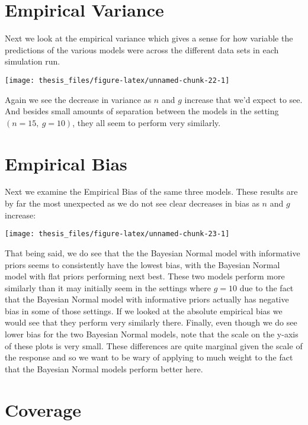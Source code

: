 \documentclass[12pt,twoside]{reedthesis}
\begin{document}
\hypertarget{empirical-variance}{%
\section{Empirical Variance}\label{empirical-variance}}

Next we look at the empirical variance which gives a sense for how variable the predictions of the various models were across the different data sets in each simulation run.
\begin{center}\texttt{[image: thesis\_files/figure-latex/unnamed-chunk-22-1]} \end{center}

Again we see the decrease in variance as \(n\) and \(g\) increase that we'd expect to see. And besides small amounts of separation between the models in the setting \((n = 15, \ g = 10)\), they all seem to perform very similarly.

\hypertarget{empirical-bias}{%
\section{Empirical Bias}\label{empirical-bias}}

Next we examine the Empirical Bias of the same three models. These results are by far the most unexpected as we do not see clear decreases in bias as \(n\) and \(g\) increase:
\begin{center}\texttt{[image: thesis\_files/figure-latex/unnamed-chunk-23-1]} \end{center}

That being said, we do see that the the Bayesian Normal model with informative priors seems to consistently have the lowest bias, with the Bayesian Normal model with flat priors performing next best. These two models perform more similarly than it may initially seem in the settings where \(g = 10\) due to the fact that the Bayesian Normal model with informative priors actually has negative bias in some of those settings. If we looked at the absolute empirical bias we would see that they perform very similarly there. Finally, even though we do see lower bias for the two Bayesian Normal models, note that the scale on the y-axis of these plots is very small. These differences are quite marginal given the scale of the response and so we want to be wary of applying to much weight to the fact that the Bayesian Normal models perform better here.

\hypertarget{coverage}{%
\section{Coverage}\label{coverage}}
\end{document}
